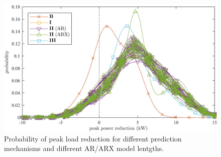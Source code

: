 \begin{figure}\centering
	\includegraphics{_chapter2/fig/difference-pdf-1}
	\caption{Probability of peak load reduction for different prediction mechanisms and different AR/ARX model lentgths.}
	\label{ch2:fig:peak-pdf-multi-length}
\end{figure}